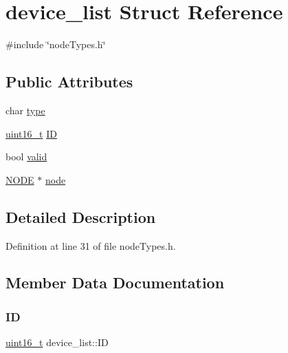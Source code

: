 \hypertarget{structdevice__list}{}\section{device\+\_\+list Struct Reference}
\label{structdevice__list}


{\ttfamily \#include \char`\"{}node\+Types.\+h\char`\"{}}

\subsection*{Public Attributes}
\begin{DoxyCompactItemize}
\item 
char \hyperlink{structdevice__list_aa21a5d471aa33420571814a6ab92cb60}{type}
\item 
\hyperlink{stdint_8h_a273cf69d639a59973b6019625df33e30}{uint16\+\_\+t} \hyperlink{structdevice__list_aec8cff9be0809a69adc266bf61cbdf37}{ID}
\item 
bool \hyperlink{structdevice__list_aed5043f9260f4acf1b56ba891e5a585d}{valid}
\item 
\hyperlink{nodeTypes_8h_a1769d7b9a8e16cf2b9da663b2c218e08}{N\+O\+DE} $\ast$ \hyperlink{structdevice__list_ad0990a0ea9bbf15244aeff7af1d24de3}{node}
\end{DoxyCompactItemize}


\subsection{Detailed Description}


Definition at line 31 of file node\+Types.\+h.



\subsection{Member Data Documentation}
\mbox{\label{structdevice__list_aec8cff9be0809a69adc266bf61cbdf37}} 
\subsubsection{\texorpdfstring{ID}{ID}}
{\footnotesize\ttfamily \hyperlink{stdint_8h_a273cf69d639a59973b6019625df33e30}{uint16\+\_\+t} device\+\_\+list\+::\+ID}



